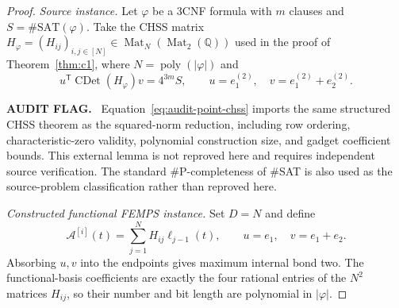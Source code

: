\documentclass[aps,pra,reprint,superscriptaddress,nofootinbib,longbibliography,showkeys]{revtex4-2}
\theoremstyle{definition}
\newenvironment{auditflag}
  {\par\smallskip\noindent\textbf{AUDIT FLAG.}\ }
  {\par\smallskip}
\newcommand{\Mat}{\operatorname{Mat}}
\newcommand{\CDet}{\operatorname{CDet}}
\begin{document}
\begin{proof}
\medskip\noindent\textit{Source instance.}\quad
Let $\varphi$ be a 3CNF formula with $m$ clauses and
$S=\#\mathrm{SAT}(\varphi)$.  Take the CHSS matrix
$H_\varphi=(H_{ij})_{i,j\in[N]}\in\Mat_N(\Mat_2(\mathbb Q))$ used in the
proof of Theorem~\ref{thm:c1}, where $N=\operatorname{poly}(|\varphi|)$ and
\begin{equation}
u^{\mathsf T}\CDet(H_\varphi)v=4^{3m}S,
\qquad u=e_1^{(2)},\quad v=e_1^{(2)}+e_2^{(2)}.
\label{eq:audit-point-chss}
\end{equation}

\begin{auditflag}
Equation~\eqref{eq:audit-point-chss} imports the same structured CHSS theorem
as the squared-norm reduction, including row ordering, characteristic-zero
validity, polynomial construction size, and gadget coefficient bounds.  This
external lemma is not reproved here and requires independent source
verification.  The standard \#P-completeness of \#SAT is also used as the
source-problem classification rather than reproved here.
\end{auditflag}

\medskip\noindent\textit{Constructed functional FEMPS instance.}\quad
Set $D=N$ and define
\begin{equation}
 \mathcal A^{[i]}(t)=\sum_{j=1}^N H_{ij}\ell_{j-1}(t),
 \qquad u=e_1,\quad v=e_1+e_2.
 \label{eq:legendre-cores}
\end{equation}
Absorbing $u,v$ into the endpoints gives maximum internal bond two.  The
functional-basis coefficients are exactly the four rational entries of the
$N^2$ matrices $H_{ij}$, so their number and bit length are polynomial in
$|\varphi|$.


\end{proof}
\end{document}
